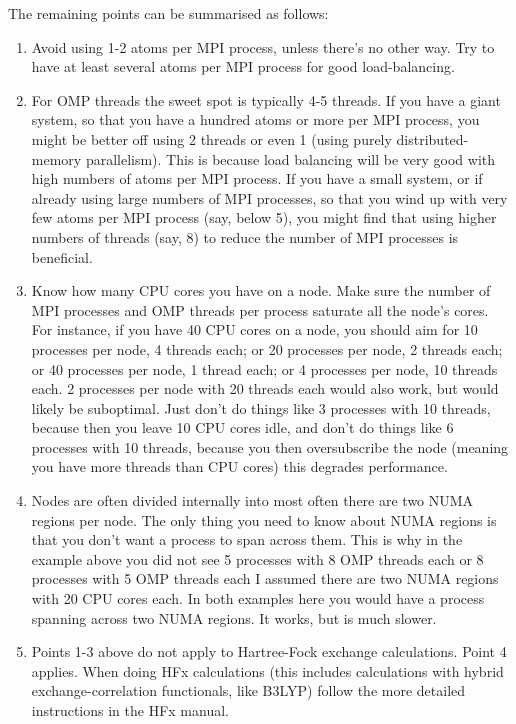 \documentclass[letterpaper,10pt,english]{sphinxmanual}
\begin{document}
The remaining points can be summarised as follows:
\begin{enumerate}
\item {} 
Avoid using 1-2 atoms per MPI process, unless there’s no other way.
Try to have at least several atoms per MPI process \textendash{} for good
load-balancing.

\item {} 
For OMP threads the sweet spot is typically 4-5 threads. If you have
a giant system, so that you have a hundred atoms or more per MPI
process, you might be better off using 2 threads or even 1 (using
purely distributed-memory parallelism). This is because load
balancing will be very good with high numbers of atoms per MPI
process. If you have a small system, or if already using large
numbers of MPI processes, so that you wind up with very few atoms per
MPI process (say, below 5), you might find that using higher numbers
of threads (say, 8) to reduce the number of MPI processes is
beneficial.

\item {} 
Know how many CPU cores you have on a node. Make sure the number of
MPI processes  and OMP threads per process saturate all the
node’s cores. For instance, if you have 40 CPU cores on a node, you
should aim for 10 processes per node, 4 threads each; or 20 processes
per node, 2 threads each; or 40 processes per node, 1 thread each; or
4 processes per node, 10 threads each. 2 processes per node with 20
threads each would also work, but would likely be suboptimal. Just
don’t do things like 3 processes with 10 threads, because then you
leave 10 CPU cores idle, and don’t do things like 6 processes with 10
threads, because you then oversubscribe the node (meaning you have
more threads than CPU cores) \textendash{} this degrades performance.

\item {} 
Nodes are often divided internally into  \textendash{} most often
there are two NUMA regions per node. The only thing you need to know
about NUMA regions is that you don’t want a process to span across
them. This is why in the example above you did not see 5 processes
with 8 OMP threads each or 8 processes with 5 OMP threads each \textendash{} I
assumed there are two NUMA regions with 20 CPU cores each. In both
examples here you would have a process spanning across two NUMA
regions. It works, but is much slower.

\item {} 
Points 1-3 above do not apply to Hartree-Fock exchange calculations.
Point 4 applies. When doing HFx calculations (this includes
calculations with hybrid exchange-correlation functionals, like
B3LYP) follow the more detailed instructions in the HFx manual.


\end{enumerate}
\end{document}
